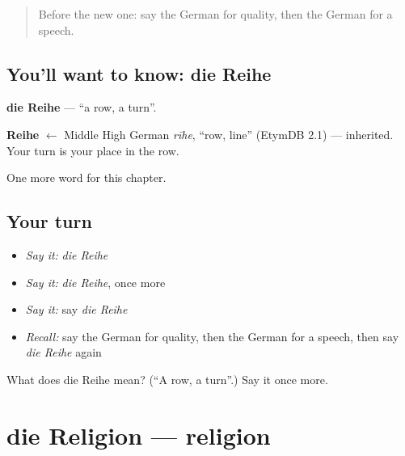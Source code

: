 \label{lesson:GE-C236-reihe}



\begin{quote}
Before the new one: say the German for quality, then the German for a speech.
\end{quote}

\subsection*{You'll want to know: die Reihe}
\textbf{die Reihe} — \textquotedblleft{}a row, a turn\textquotedblright{}.

\begin{cousinweb}
\textbf{Reihe} $\leftarrow$ Middle High German \emph{rīhe}, \textquotedblleft{}row, line\textquotedblright{} (EtymDB 2.1) — inherited. Your turn is your place in the row.
\end{cousinweb}

\begin{grammarlens}[title={What you've built}]
One more word for this chapter.
\end{grammarlens}

\subsection*{Your turn}
\begin{itemize}
\raggedright
  \item \emph{Say it:} \emph{die Reihe}
  \item \emph{Say it:} \emph{die Reihe}, once more
  \item \emph{Say it:} say \emph{die Reihe}
  \item \emph{Recall:} say the German for quality, then the German for a speech, then say \emph{die Reihe} again
\end{itemize}

\begin{tcolorbox}[breakable,colback=teal!4,colframe=teal!35!black,title={Before you move on}]
What does die Reihe mean? (\textquotedblleft{}A row, a turn\textquotedblright{}.) Say it once more.
\end{tcolorbox}
\section[die Religion]{die Religion — religion}

\label{lesson:GE-C236-religion}



